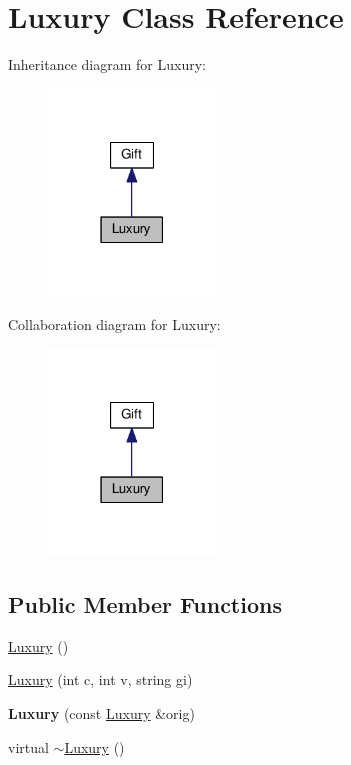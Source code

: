 \hypertarget{class_luxury}{\section{Luxury Class Reference}
\label{class_luxury}
}


Inheritance diagram for Luxury\-:
\nopagebreak
\begin{figure}[H]
\begin{center}
\leavevmode
\includegraphics[width=126pt]{class_luxury__inherit__graph}
\end{center}
\end{figure}


Collaboration diagram for Luxury\-:
\nopagebreak
\begin{figure}[H]
\begin{center}
\leavevmode
\includegraphics[width=126pt]{class_luxury__coll__graph}
\end{center}
\end{figure}
\subsection*{Public Member Functions}
\begin{DoxyCompactItemize}
\item 
\hyperlink{class_luxury_a108be0ac2e146a70e1e27292105ba116}{Luxury} ()
\item 
\hyperlink{class_luxury_a39a11d8e47f9d07ea472eff25cef585a}{Luxury} (int c, int v, string gi)
\item 
\hypertarget{class_luxury_a37fe28cf0146e58540757f040939e413}{{\bfseries Luxury} (const \hyperlink{class_luxury}{Luxury} \&orig)}\label{class_luxury_a37fe28cf0146e58540757f040939e413}

\item 
virtual \hyperlink{class_luxury_a3b0565d6b645460877ce08a7fff5d44d}{$\sim$\-Luxury} ()
\end{DoxyCompactItemize}
